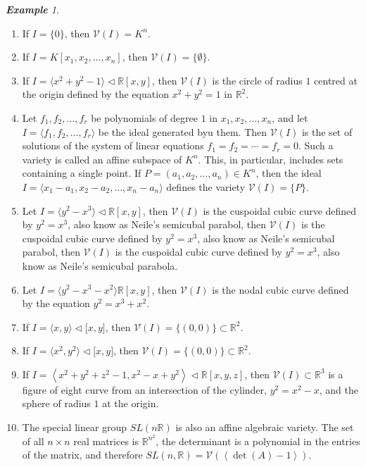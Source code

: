 \documentclass[titlepage]{article}
\theoremstyle{remark}
\newtheorem{example}[definition]{\textbf{Example}}
\newcommand{\idealof}{\vartriangleleft}
\newcommand{\idealgen}[1]{\ensuremath{\left\langle#1\right\rangle}}
\begin{document}
  \begin{example}$ $
    \begin{enumerate}
      \item If $I=\{0\}$, then $\mathcal{V}(I)=K^n$.
      \item If $I=K[x_1,x_2,\dots,x_n]$, then $\mathcal{V}(I)=\{\emptyset\}$.
      \item If $I=\langle x^2+y^2-1\rangle\vartriangleleft\mathbb{R}[x,y]$, then $\mathcal{V}(I)$ is the circle of radius $1$ centred at the origin defined by the equation $x^2+y^2=1$ in $\mathbb{R}^2$.
      \item Let $f_1,f_2,\dots,f_r$ be polynomials of degree $1$ in $x_1,x_2,\dots,x_n$, and let $I=\langle f_1,f_2,\dots,f_r\rangle$ be the ideal generated byu them. Then $\mathcal{V}(I)$ is the set of solutions of the system of linear equations $f_1=f_2=\cdots=f_r=0$. Such a variety is called an affine subspace of $K^n$. This, in particular, includes sets containing a single point. If $P=(a_1,a_2,\dots,a_n)\in K^n$, then the ideal $I=\langle x_1-a_1,x_2-a_2,\dots,x_n-a_n\rangle$ defines the variety $\mathcal{V}(I)=\{P\}$.
      \item Let $I=\langle y^2-x^3\rangle\vartriangleleft\mathbb{R}[x,y]$, then $\mathcal{V}(I)$ is the cuspoidal cubic curve defined by $y^2=x^3$, also know as Neile's semicubal parabol, then $\mathcal{V}(I)$ is the cuspoidal cubic curve defined by $y^2=x^3$, also know as Neile's semicubal parabol, then $\mathcal{V}(I)$ is the cuspoidal cubic curve defined by $y^2=x^3$, also know as Neile's semicubal parabola.
      \item Let $I=\langle y^2-x^3-x^2\rangle\mathbb{R}[x,y]$, then $\mathcal{V}(I)$ is the nodal cubic curve defined by the equation $y^2=x^3+x^2$.
      \item If $I=\langle x,y\rangle\vartriangleleft\mathbb[x,y]$, then $\mathcal{V}(I)=\{(0,0)\}\subset\mathbb{R}^2$.
      \item If $I=\langle x^2,y^2\rangle\vartriangleleft\mathbb[x,y]$, then $\mathcal{V}(I)=\{(0,0)\}\subset\mathbb{R}^2$.
      \item If $I=\idealgen{x^2+y^2+z^2-1,x^2-x+y^2}\idealof\mathbb{R}[x,y,z]$, then $\mathcal{V}(I)\subset\mathbb{R}^3$ is a figure of eight curve from an intersection of the cylinder, $y^2=x^2-x$, and the sphere of radius $1$ at the origin.
      \item The special linear group $SL(n\mathbb{R})$ is also an affine algebraic variety. The set of all $n\times n$ real matrices is $\mathbb{R}^{n^2}$, the determinant is a polynomial in the entries of the matrix, and therefore $SL(n,\mathbb{R})=\mathcal{V}(\idealgen{\det{(A)}-1})$.
    \end{enumerate}
  \end{example}
\end{document}
